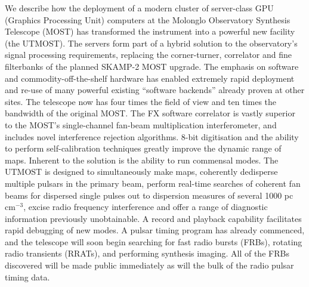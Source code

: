 We describe how the deployment of a modern cluster of server-class GPU (Graphics Processing Unit) computers at the Molonglo Observatory Synthesis Telescope (MOST) has transformed the instrument into a powerful new facility (the UTMOST). The servers form part of a hybrid solution to the observatory's signal processing requirements, replacing the corner-turner, correlator and fine filterbanks of the planned SKAMP-2 MOST upgrade. The emphasis on software and commodity-off-the-shelf hardware has enabled extremely rapid deployment and re-use of many powerful existing ``software backends'' already proven at other sites. The telescope now has four times the field of view and ten times the bandwidth of the original MOST. The FX software correlator is vastly superior to the MOST's single-channel fan-beam multiplication interferometer, and includes novel interference rejection algorithms. 8-bit digitisation and the ability to perform self-calibration techniques greatly improve the dynamic range of maps. Inherent to the solution is the ability to run commensal modes. The UTMOST is designed to simultaneously make maps, coherently dedisperse multiple pulsars in the primary beam, perform real-time searches of coherent fan beams for dispersed single pulses out to dispersion measures of several 1000 pc cm$^{-3}$, excise radio frequency interference and offer a range of diagnostic information previously unobtainable. A record and playback capability facilitates rapid debugging of new modes. A pulsar timing program has already commenced, and the telescope will soon begin searching for fast radio bursts (FRBs), rotating radio transients (RRATs), and performing synthesis imaging. All of the FRBs discovered will be made public immediately as will the bulk of the radio pulsar timing data. 
